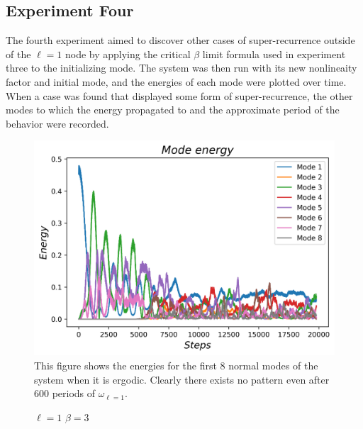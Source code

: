 \documentclass[twocolumn]{article}
\begin{document}
\subsection{Experiment Four}
The fourth experiment aimed to discover other cases of super-recurrence outside of the $\ell=1$ node by applying the critical $\beta$ limit formula used in experiment three to the initializing mode. The system was then run with its new nonlineaity factor and initial mode, and the energies of each mode were plotted over time. When a case was found that displayed some form of super-recurrence, the other modes to which the energy propagated to and the approximate period of the behavior were recorded.
\begin{figure}[ht!]
\centering
\caption{$\ell=1$ $\beta=3$}
\includegraphics[scale=.53]{EnergiesN=1B=3}
\small{This figure shows the energies for the first 8 normal modes of the system when it is ergodic. Clearly there exists no pattern even after 600 periods of $\omega_{\ell=1}$.}
\end{figure}
\end{document}
